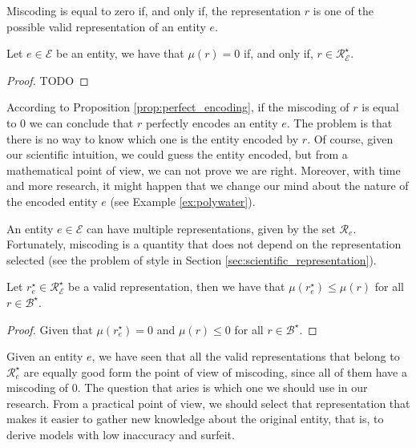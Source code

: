 Miscoding is equal to zero if, and only if, the representation $r$ is one of the possible valid representation of an entity $e$.

\begin{proposition}\label{prop:perfect_encoding}
Let $e \in \mathcal{E}$ be an entity, we have that $\mu(r) = 0$ if, and only if, $r \in \mathcal{R}^\star_\mathcal{E}$.
\end{proposition}
\begin{proof}
{\color{red} TODO}
\end{proof}

According to Proposition \ref{prop:perfect_encoding}, if the miscoding of $r$ is equal to 0 we can conclude that $r$ perfectly encodes an entity $e$. The problem is that there is no way to know which one is the entity encoded by $r$. Of course, given our scientific intuition, we could guess the entity encoded, but from a mathematical point of view, we can not prove we are right. Moreover, with time and more research, it might happen that we change our mind about the nature of the encoded entity $e$ (see Example \ref{ex:polywater}).

An entity $e \in \mathcal{E}$ can have multiple representations, given by the set $\mathcal{R}_e$. Fortunately, miscoding is a quantity that does not depend on the representation selected (see the problem of style in Section \ref{sec:scientific_representation}).

\begin{proposition}
Let $r^\star_e \in \mathcal{R}^\star_\mathcal{E}$ be a valid representation, then we have that $\mu\left( r^\star_e \right) \leq \mu\left( r \right)$ for all $r \in \mathcal{B}^\star$.
\end{proposition}
\begin{proof}
Given that $\mu\left( r^\star_e \right) = 0$ and $\mu\left( r \right) \leq 0$ for all $r \in \mathcal{B}^\star$.
\end{proof}

Given an entity $e$, we have seen that all the valid representations that belong to $\mathcal{R}^\star_e$ are equally good form the point of view of miscoding, since all of them have a miscoding of $0$. The question that aries is which one we should use in our research. From a practical point of view, we should select that representation that makes it easier to gather new knowledge about the original entity, that is, to derive models with low inaccuracy and surfeit.

